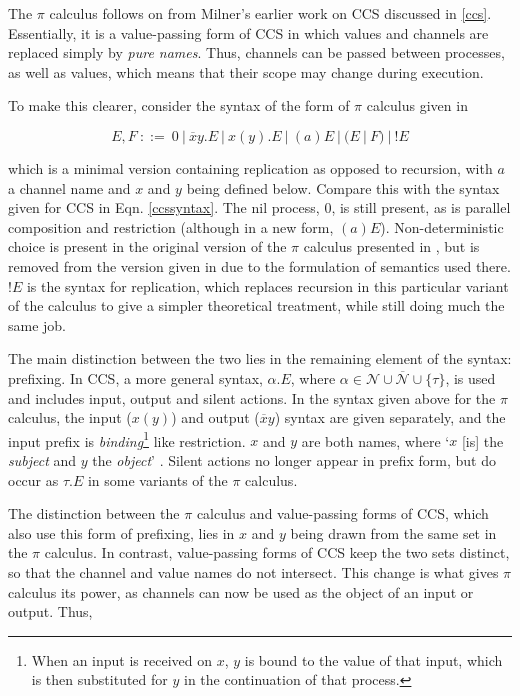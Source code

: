 The $\pi$ calculus \cite*{milner:pi} follows on from Milner's earlier
work on CCS discussed in \ref{ccs}. Essentially, it is a value-passing
form of CCS in which values and channels are replaced simply by
\emph{pure names}.  Thus, channels can be passed between processes, as
well as values, which means that their scope may change during
execution.

To make this clearer, consider the syntax of the form of $\pi$ calculus
given in \cite*{funcproc}

\begin{equation}
\label{pisyntax}
  E, F\ ::=\ 
  0\ |\ 
  \overline{x}y.E\ |\ 
  x(y).E\ |\ 
  (a)E\ |\ 
  (E\ |\ F)\ |\ 
  !E
\end{equation}
  
\noindent which is a minimal version containing replication as opposed
to recursion, with $a$ a channel name and $x$ and $y$ being defined
below.  Compare this with the syntax given for CCS in Eqn.
\ref{ccssyntax}.  The nil process, $0$, is still present, as is parallel
composition and restriction (although in a new form, $(a)E$).
Non-deterministic choice is present in the original version of the $\pi$
calculus presented in \cite*{picalctutorial}, but is removed from the
version given in \cite{funcproc} due to the formulation of semantics
used there.  $!E$ is the syntax for replication, which replaces
recursion in this particular variant of the calculus to give a simpler
theoretical treatment, while still doing much the same job.

The main distinction between the two lies in the remaining element of
the syntax: prefixing.  In CCS, a more general syntax, $\alpha.E$,
where $\alpha \in \mathcal{N} \cup \overline{\mathcal{N}} \cup
\{\tau\}$, is used and includes input, output and silent actions.  In
the syntax given above for the $\pi$ calculus, the input ($x(y)$) and
output ($\overline{x}y$) syntax are given separately, and the input
prefix is \emph{binding}\footnote{When an input is received on $x$,
  $y$ is bound to the value of that input, which is then substituted
  for $y$ in the continuation of that process.} like restriction. $x$
and $y$ are both names, where `$x$ [is] the \emph{subject} and $y$ the
\emph{object}' \cite{funcproc}.  Silent actions no longer appear in
prefix form, but do occur as $\tau.E$ in some variants of the $\pi$
calculus.

The distinction between the $\pi$ calculus and value-passing forms of
CCS, which also use this form of prefixing, lies in $x$ and $y$ being
drawn from the same set in the $\pi$ calculus.  In contrast,
value-passing forms of CCS keep the two sets distinct, so that the
channel and value names do not intersect.  This change is what
gives $\pi$ calculus its power, as channels can now be used as the
object of an input or output.  Thus,


